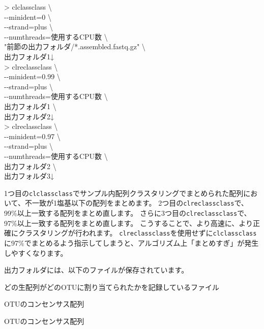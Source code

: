\documentclass[titlepage,10pt,a4paper]{jsbook}
\newenvironment{cmd}{\begin{oframed}\raggedright\ttfamily\footnotesize\setlength{\baselineskip}{1.4em}}{\end{oframed}\vspace{-1em}}
\begin{document}
\begin{cmd}
{\textgreater} clclassclass {\textbackslash}\\
{-}{-}minident=0 {\textbackslash}\\
{-}{-}strand=plus {\textbackslash}\\
{-}{-}numthreads=使用するCPU数 {\textbackslash}\\
"前節の出力フォルダ/*.assembled.fastq.gz" {\textbackslash}\\
出力フォルダ1↓\\
{\textgreater} clreclassclass {\textbackslash}\\
{-}{-}minident=0.99 {\textbackslash}\\
{-}{-}strand=plus {\textbackslash}\\
{-}{-}numthreads=使用するCPU数 {\textbackslash}\\
出力フォルダ1 {\textbackslash}\\
出力フォルダ2↓\\
{\textgreater} clreclassclass {\textbackslash}\\
{-}{-}minident=0.97 {\textbackslash}\\
{-}{-}strand=plus {\textbackslash}\\
{-}{-}numthreads=使用するCPU数 {\textbackslash}\\
出力フォルダ2 {\textbackslash}\\
出力フォルダ3↓
\end{cmd}

1つ目の\texttt{clclassclass}でサンプル内配列クラスタリングでまとめられた配列において、不一致が1塩基以下の配列をまとめます。
2つ目の\texttt{clreclassclass}で、99\%以上一致する配列をまとめ直します。
さらに3つ目の\texttt{clreclassclass}で、97\%以上一致する配列をまとめ直します。
こうすることで、より高速に、より正確にクラスタリングが行われます。
\texttt{clreclassclass}を使用せずに\texttt{clclassclass}に97\%でまとめるよう指示してしまうと、アルゴリズム上「まとめすぎ」が発生しやすくなります。

出力フォルダには、以下のファイルが保存されています。

\begin{description}\small\setlength{\baselineskip}{1.1em}
\item[assembled.contigmembers.gz] どの生配列がどのOTUに割り当てられたかを記録しているファイル
\item[assembled.fastq.gz] OTUのコンセンサス配列
\item[assembled.fasta] OTUのコンセンサス配列
\end{description}
\end{document}
